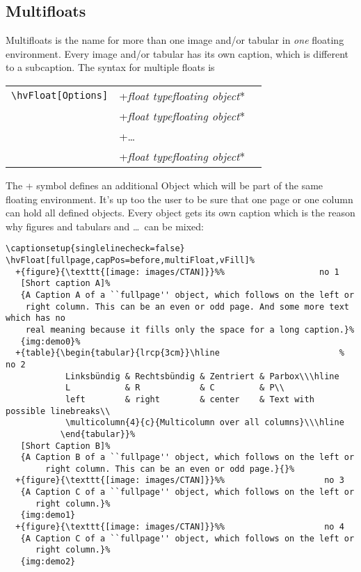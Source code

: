 \documentclass[twoside,paper=a4,usegeometry,index=totoc]{scrartcl}
\makeatletter
\def\Lcs#1{\texttt{\textbackslash#1}\index{#1@\texttt{\textbackslash#1}}}
\newenvironment{BDef}
  {\begin{lrbox}{\boxdef}
      \def\arraystretch{1.0}
      \begin{tabular}{@{}l@{}l@{}l@{}}}
  {\end{tabular}\end{lrbox}
%
%
   {\BCmd\fbox{\usebox\boxdef}\endBCmd}
   \aftergroup\@afterindentfalse\aftergroup\@afterheading
  }
\def\OptArgs{\colorbox{black!20}{\texttt{[Options]}}\kern1pt}
\def\OptArg{\@ifnextchar*\OptArg@i{\OptArg@ii*}}%
\def\OptArg@i*#1{\colorbox{black!20}{\texttt{#1}}\kern1pt}
\def\OptArg@ii*#1{\colorbox{black!20}{\texttt{[#1]}}\kern1pt}
\newcommand\Larg [1]{{\normalfont\itshape#1\/}}
\newcommand\Largb[1]{\lcb\Larg{#1}\rcb}          %
\DeclareRobustCommand\lcb{{\normalfont\ttfamily\textbraceleft}}
\DeclareRobustCommand\rcb{{\normalfont\ttfamily\textbraceright}}
\makeatother
\begin{document}
\FloatBarrier


\clearpage


\subsection{Multifloats}\label{sec:multifloats}
Multifloats is the name for more than one image and/or tabular in \emph{one} floating
environment. Every image and/or tabular has its own caption, which is different to
a subcaption. The syntax for multiple floats is

\begin{BDef}
\Lcs{hvFloat}\OptArgs&+\Largb{float type}\Largb{floating object}\OptArg{short caption}\Largb{long caption}\Largb{label}\\
&+\Largb{float type}\Largb{floating object}\OptArg{short caption}\Largb{long caption}\Largb{label}\\
&+\ldots\\
&+\Largb{float type}\Largb{floating object}\OptArg{short caption}\Largb{long caption}\Largb{label}
\end{BDef}

The + symbol defines an additional Object which will be part of the same floating environment.
It's up too the user to be sure that one page or one column can hold all defined objects.
Every object gets its own caption which is the reason why figures and tabulars and \ldots\ 
can be mixed:

\begin{lstlisting}
\captionsetup{singlelinecheck=false}
\hvFloat[fullpage,capPos=before,multiFloat,vFill]%
  +{figure}{\texttt{[image: images/CTAN]}}%%                   no 1
   [Short caption A]%
   {A Caption A of a ``fullpage'' object, which follows on the left or
    right column. This can be an even or odd page. And some more text which has no
    real meaning because it fills only the space for a long caption.}%
   {img:demo0}%
  +{table}{\begin{tabular}{lrcp{3cm}}\hline                        %             no 2
            Linksbündig & Rechtsbündig & Zentriert & Parbox\\\hline
            L           & R            & C         & P\\
            left        & right        & center    & Text with possible linebreaks\\
            \multicolumn{4}{c}{Multicolumn over all columns}\\\hline
           \end{tabular}}%
   [Short Caption B]%
   {A Caption B of a ``fullpage'' object, which follows on the left or
        right column. This can be an even or odd page.}{}%
  +{figure}{\texttt{[image: images/CTAN]}}%%                    no 3
   {A Caption C of a ``fullpage'' object, which follows on the left or
      right column.}%
   {img:demo1}
  +{figure}{\texttt{[image: images/CTAN]}}%%                    no 4
   {A Caption C of a ``fullpage'' object, which follows on the left or
      right column.}%
   {img:demo2}
\end{lstlisting}
\end{document}
